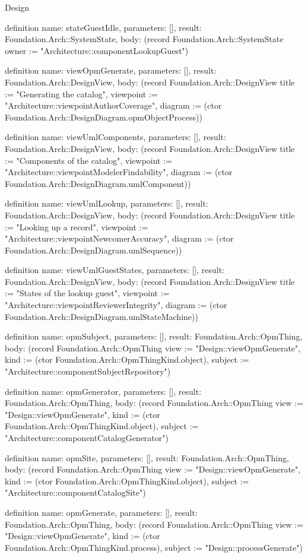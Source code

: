 \begin{lexlean}{Design}
\begin{semanticmodule}
definition{
  name: stateGuestIdle,
  parameters: [],
  result: Foundation.Arch::SystemState,
  body: (record Foundation.Arch::SystemState {owner := "Architecture::componentLookupGuest"})
}

definition{
  name: viewOpmGenerate,
  parameters: [],
  result: Foundation.Arch::DesignView,
  body: (record Foundation.Arch::DesignView {title := "Generating the catalog", viewpoint := "Architecture::viewpointAuthorCoverage", diagram := (ctor Foundation.Arch::DesignDiagram.opmObjectProcess)})
}

definition{
  name: viewUmlComponents,
  parameters: [],
  result: Foundation.Arch::DesignView,
  body: (record Foundation.Arch::DesignView {title := "Components of the catalog", viewpoint := "Architecture::viewpointModelerFindability", diagram := (ctor Foundation.Arch::DesignDiagram.umlComponent)})
}

definition{
  name: viewUmlLookup,
  parameters: [],
  result: Foundation.Arch::DesignView,
  body: (record Foundation.Arch::DesignView {title := "Looking up a record", viewpoint := "Architecture::viewpointNewcomerAccuracy", diagram := (ctor Foundation.Arch::DesignDiagram.umlSequence)})
}

definition{
  name: viewUmlGuestStates,
  parameters: [],
  result: Foundation.Arch::DesignView,
  body: (record Foundation.Arch::DesignView {title := "States of the lookup guest", viewpoint := "Architecture::viewpointReviewerIntegrity", diagram := (ctor Foundation.Arch::DesignDiagram.umlStateMachine)})
}

definition{
  name: opmSubject,
  parameters: [],
  result: Foundation.Arch::OpmThing,
  body: (record Foundation.Arch::OpmThing {view := "Design::viewOpmGenerate", kind := (ctor Foundation.Arch::OpmThingKind.object), subject := "Architecture::componentSubjectRepository"})
}

definition{
  name: opmGenerator,
  parameters: [],
  result: Foundation.Arch::OpmThing,
  body: (record Foundation.Arch::OpmThing {view := "Design::viewOpmGenerate", kind := (ctor Foundation.Arch::OpmThingKind.object), subject := "Architecture::componentCatalogGenerator"})
}

definition{
  name: opmSite,
  parameters: [],
  result: Foundation.Arch::OpmThing,
  body: (record Foundation.Arch::OpmThing {view := "Design::viewOpmGenerate", kind := (ctor Foundation.Arch::OpmThingKind.object), subject := "Architecture::componentCatalogSite"})
}

definition{
  name: opmGenerate,
  parameters: [],
  result: Foundation.Arch::OpmThing,
  body: (record Foundation.Arch::OpmThing {view := "Design::viewOpmGenerate", kind := (ctor Foundation.Arch::OpmThingKind.process), subject := "Design::processGenerate"})
}


\end{semanticmodule}
\end{lexlean}
